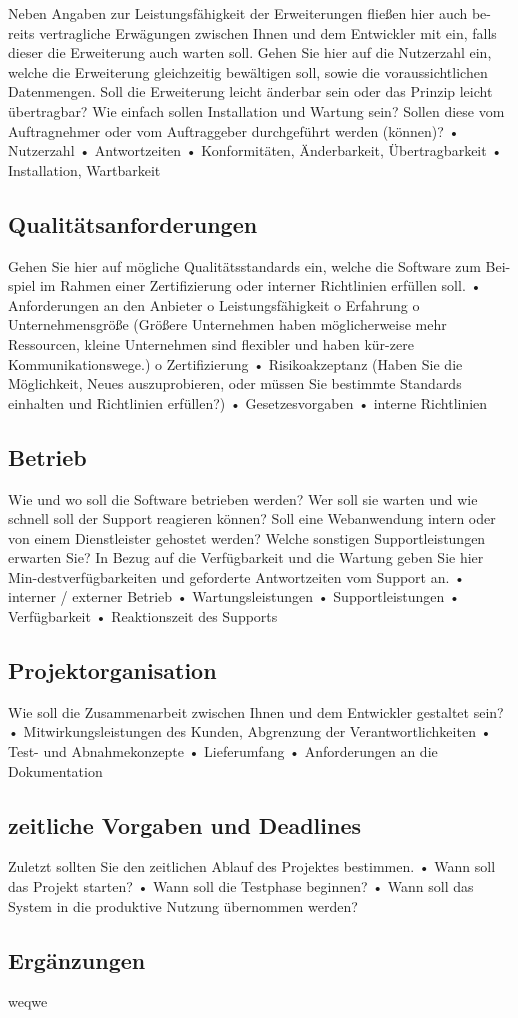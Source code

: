 Neben Angaben zur Leistungsfähigkeit der Erweiterungen fließen hier auch be-reits vertragliche Erwägungen zwischen Ihnen und dem Entwickler mit ein, falls dieser die Erweiterung auch warten soll. Gehen Sie hier auf die Nutzerzahl ein, welche die Erweiterung gleichzeitig bewältigen soll, sowie die voraussichtlichen Datenmengen. Soll die Erweiterung leicht änderbar sein oder das Prinzip leicht übertragbar? Wie einfach sollen Installation und Wartung sein? Sollen diese vom Auftragnehmer oder vom Auftraggeber durchgeführt werden (können)?
•	Nutzerzahl
•	Antwortzeiten
•	Konformitäten, Änderbarkeit, Übertragbarkeit
•	Installation, Wartbarkeit 


\subsection{Qualitätsanforderungen}

Gehen Sie hier auf mögliche Qualitätsstandards ein, welche die Software zum Bei-spiel im Rahmen einer Zertifizierung oder interner Richtlinien erfüllen soll. 
•	Anforderungen an den Anbieter 
o	Leistungsfähigkeit
o	Erfahrung
o	Unternehmensgröße (Größere Unternehmen haben möglicherweise mehr Ressourcen, kleine Unternehmen sind flexibler und haben kür-zere Kommunikationswege.)
o	Zertifizierung
•	Risikoakzeptanz (Haben Sie die Möglichkeit, Neues auszuprobieren, oder müssen Sie bestimmte Standards einhalten und Richtlinien erfüllen?) 
•	Gesetzesvorgaben
•	interne Richtlinien

\subsection{Betrieb}

Wie und wo soll die Software betrieben werden? Wer soll sie warten und wie schnell soll der Support reagieren können? Soll eine Webanwendung intern oder von einem Dienstleister gehostet werden? Welche sonstigen Supportleistungen erwarten Sie? In Bezug auf die Verfügbarkeit und die Wartung geben Sie hier Min-destverfügbarkeiten und geforderte Antwortzeiten vom Support an. 
•	interner / externer Betrieb
•	Wartungsleistungen
•	Supportleistungen
•	Verfügbarkeit
•	Reaktionszeit des Supports 

\subsection{Projektorganisation}

Wie soll die Zusammenarbeit zwischen Ihnen und dem Entwickler gestaltet sein? 
•	Mitwirkungsleistungen des Kunden, Abgrenzung der Verantwortlichkeiten
•	Test- und Abnahmekonzepte
•	Lieferumfang
•	Anforderungen an die Dokumentation

\subsection{zeitliche Vorgaben und Deadlines}

Zuletzt sollten Sie den zeitlichen Ablauf des Projektes bestimmen. 
•	Wann soll das Projekt starten?
•	Wann soll die Testphase beginnen? 
•	Wann soll das System in die produktive Nutzung übernommen werden?

\subsection{Ergänzungen}

weqwe
